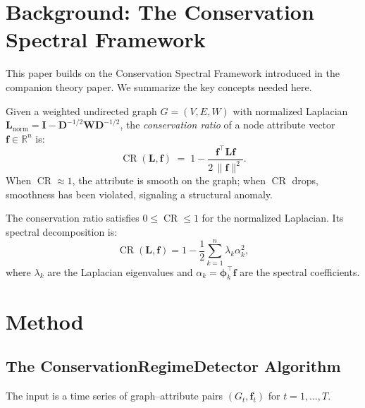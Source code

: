 \documentclass[11pt,a4paper]{article}
\newcommand{\R}{\mathbb{R}}
\newcommand{\bff}{\mathbf{f}}
\newcommand{\bL}{\mathbf{L}}
\newcommand{\bW}{\mathbf{W}}
\newcommand{\bD}{\mathbf{D}}
\newcommand{\bphi}{\boldsymbol{\phi}}
\DeclareMathOperator{\CR}{CR}
\begin{document}
\section{Background: The Conservation Spectral Framework}
\label{sec:background}

This paper builds on the Conservation Spectral Framework introduced in the
companion theory paper. We summarize the key concepts needed here.

Given a weighted undirected graph $G = (V, E, W)$ with normalized Laplacian
$\bL_{\mathrm{norm}} = \mathbf{I} - \bD^{-1/2} \bW \bD^{-1/2}$, the
\emph{conservation ratio} of a node attribute vector $\bff \in \R^n$ is:
\begin{equation}\label{eq:cr}
  \CR(\bL, \bff) \;=\; 1 - \frac{\bff^\top \bL \bff}{2\, \|\bff\|^2}.
\end{equation}
When $\CR \approx 1$, the attribute is smooth on the graph; when $\CR$ drops,
smoothness has been violated, signaling a structural anomaly.

The conservation ratio satisfies $0 \leq \CR \leq 1$ for the normalized Laplacian.
Its spectral decomposition is:
\begin{equation}\label{eq:cr-spectral}
  \CR(\bL, \bff) = 1 - \frac{1}{2}\sum_{k=1}^{n} \lambda_k \alpha_k^2,
\end{equation}
where $\lambda_k$ are the Laplacian eigenvalues and $\alpha_k = \bphi_k^\top \bff$
are the spectral coefficients.

\section{Method}
\label{sec:method}

\subsection{The ConservationRegimeDetector Algorithm}

The input is a time series of graph--attribute pairs $(G_t, \bff_t)$ for
$t = 1, \ldots, T$.
\end{document}
